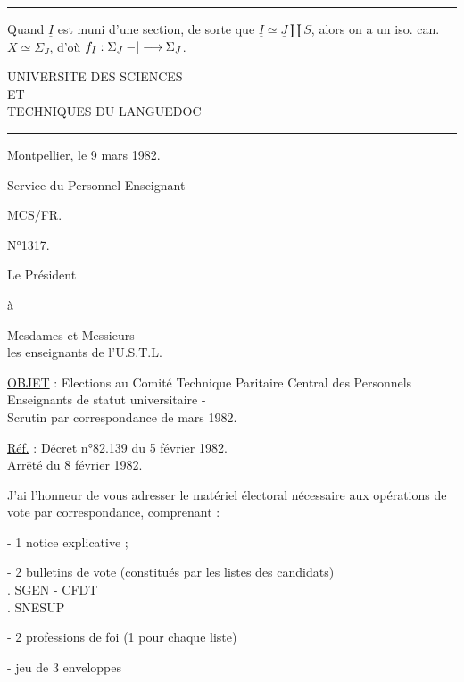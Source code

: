 
\medskip\hrule\medskip
Quand $\underline I$ est muni d'une section, de sorte que $\underline I\simeq\underline J\amalg S$, alors on a un iso. can. $X\simeq\Sigma_J$, d'où $f_{I}:\Sigma_J\mathbin{-|\longrightarrow}\Sigma_J$.
\begin{center}
UNIVERSITE DES SCIENCES\\
ET\\
TECHNIQUES DU LANGUEDOC
\end{center}
\hrule

Montpellier, le 9 mars 1982.

Service du Personnel Enseignant

MCS/FR.

N°1317.

Le Président

à

Mesdames et Messieurs\\
les enseignants de l'U.S.T.L.

\uline{OBJET} : Elections au Comité Technique Paritaire Central des Personnels Enseignants de statut universitaire -\\
Scrutin par correspondance de mars 1982.

\uline{Réf.} : Décret n°82.139 du 5 février 1982.\\
Arrêté du 8 février 1982.

J'ai l'honneur de vous adresser le matériel électoral nécessaire aux opérations de vote par correspondance, comprenant :

- 1 notice explicative ;

- 2 bulletins de vote (constitués par les listes des candidats)\\
\hspace*{2em}. SGEN - CFDT\\
\hspace*{2em}. SNESUP

- 2 professions de foi (1 pour chaque liste)

- jeu de 3 enveloppes

